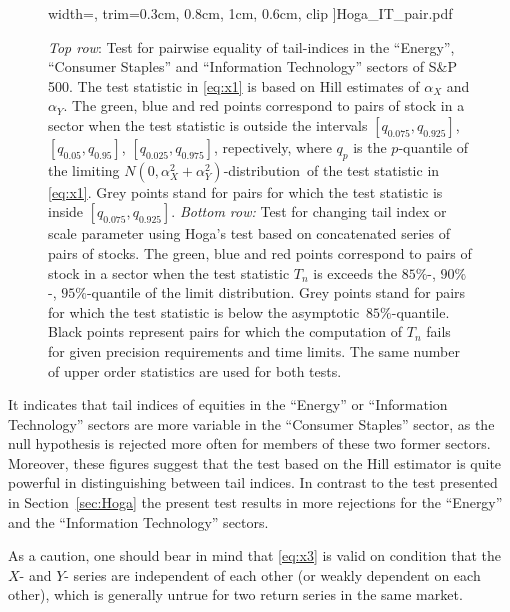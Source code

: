 \documentclass[11pt,a4]{amsart}
\newcommand{\asy}{asymptotic}
\newcommand{\ds}{distribution}
\newcommand{\1}{{\mathbf 1}}
\begin{document}
\begin{figure}[htb!]
\begin{minipage}{0.33\linewidth}
      width=\textwidth,
      trim={0.3cm, 0.8cm, 1cm, 0.6cm}, clip
    ]{Hoga_IT_pair.pdf}
  \end{minipage}
  \caption{{\em Top row}: Test for pairwise equality of tail-indices in the 
    ``Energy'', ``Consumer Staples'' and ``Information Technology'' 
    sectors of S\&P 500. The test statistic in \eqref{eq:x1} is based on Hill estimates 
    of $\alpha_X$ and $\alpha_Y$. 
    The green, blue and red points correspond to pairs of stock in a sector
    when the test statistic is outside the intervals $[q_{0.075},q_{0.925}]$,
 $[q_{0.05},q_{0.95}]$,  $[q_{0.025},q_{0.975}]$, repectively, where $q_p$ is the $p$-quantile of the limiting
$N(0,\alpha_X^2+\alpha_Y^2)$-\ds\ of the test statistic in \eqref{eq:x1}. 
    Grey points stand for pairs for which the test statistic is inside $[q_{0.075},q_{0.925}]$. 
    {\em Bottom row:} Test for changing tail index or scale parameter     
    using Hoga's test based on concatenated series of pairs of stocks. The green, blue and red points 
correspond to pairs of stock in a sector 
    when the test statistic $T_n$ is exceeds the $85\%$-, $90\%$-, $95\%$-quantile of the limit \ds .  
  Grey points stand for pairs for which the test statistic is below the \asy\ $85\%$-quantile. Black points represent
    pairs for which the computation of $T_n$ fails for given precision  
    requirements and time limits.
    The same number of upper order statistics are used for both tests.}
  \label{fig:PairTest} 
\end{figure}
It indicates that tail indices of equities in the
``Energy'' or ``Information Technology'' sectors are more variable 
in the ``Consumer Staples'' sector, as the null
hypothesis is rejected more often for members of these two former sectors.
Moreover, these figures suggest that the test based on the Hill estimator
is quite powerful in distinguishing between tail indices. In contrast to the test presented in Section~\ref{sec:Hoga}
the present test results in  more rejections for the ``Energy'' and the
``Information Technology'' sectors.
\par
As a caution, one should bear in mind that 
\eqref{eq:x3} is valid on condition that the $X$- and $Y$-
series are independent of each other (or weakly dependent on each other), which is generally untrue for
two return series in the same market.
\end{document}
